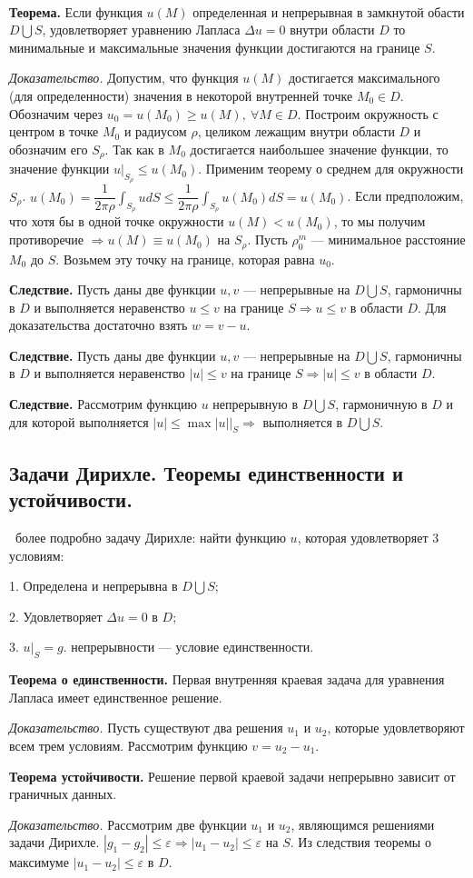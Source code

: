\documentclass[9pt]{article}
\begin{document}
\ 
\par\textbf{Теорема.} Если функция \(u(M)\) определенная и непрерывная в замкнутой обасти \(D\bigcup S\), удовлетворяет уравнению Лапласа \(\Delta u=0\) внутри области \(D\) то минимальные и максимальные значения функции достигаются на границе \(S\).
\par\textit{Доказательство.} Допустим, что функция \(u(M)\) достигается максимального (для определенности) значения в некоторой внутренней точке \(M_0\in D\). Обозначим через \(u_0=u(M_0)\ge u(M),\ \forall M\in D\). Построим окружность с центром в точке \(M_0\) и радиусом \(\rho\), целиком лежащим внутри области \(D\) и обозначим его \(S_\rho\). Так как в \(M_0\) достигается наибольшее значение функции, то значение функции \(u|_{S_\rho}\le u(M_0)\). Применим теорему о среднем для окружности \(S_\rho\). \(u(M_0)=\dfrac{1}{2\pi \rho}\int_{S_\rho}udS\le \dfrac{1}{2\pi\rho}\int_{S_\rho}u(M_0)dS=u(M_0)\). Если предположим, что хотя бы в одной точке окружности \(u(M)<u(M_0)\), то мы получим противоречие \(\Rightarrow u(M)\equiv u(M_0)\) на \(S_\rho\). Пусть \(\rho_0^m\) --- минимальное расстояние \(M_0\) до \(S\). Возьмем эту точку на границе, которая равна \(u_0\).
\par\textbf{Следствие.} Пусть даны две функции \(u,v\) --- непрерывные на \(D\bigcup S\), гармоничны в \(D\) и выполняется неравенство \(u\le v\) на границе \(S\Rightarrow u\le v\) в области \(D\). Для доказательства достаточно взять \(w=v-u\).
\par\textbf{Следствие.} Пусть даны две функции \(u,v\) --- непрерывные на \(D\bigcup S\), гармоничны в \(D\) и выполняется неравенство \(|u|\le v\) на границе \(S\Rightarrow |u|\le v\) в области \(D\).
\par\textbf{Следствие.} Рассмотрим функцию \(u\) непрерывную в \(D\bigcup S\), гармоничную в \(D\) и для которой выполняется \(|u|\le\max|u||_S\Rightarrow\) выполняется в \(D\bigcup S\).

\subsection{Задачи Дирихле. Теоремы единственности и устойчивости.}

\ 
 более подробно задачу Дирихле: найти функцию \(u\), которая удовлетворяет 3 условиям:
\par1. Определена и непрерывна в \(D\bigcup S\);
\par2. Удовлетворяет \(\Delta u=0\) в \(D\);
\par3. \(u|_S=g\).
 непрерывности --- условие единственности. 
\par\textbf{Теорема о единственности.} Первая внутренняя краевая задача для уравнения Лапласа имеет единственное решение.
\par\textit{Доказательство.} Пусть существуют два решения \(u_1\) и \(u_2\), которые удовлетворяют всем трем условиям. Рассмотрим функцию \(v=u_2-u_1\).
\par\textbf{Теорема устойчивости.} Решение первой краевой задачи непрерывно зависит от граничных данных.
\par\textit{Доказательство.} Рассмотрим две функции \(u_1\) и \(u_2\), являющимся решениями задачи Дирихле. \(|g_1-g_2|\le\varepsilon\Rightarrow|u_1-u_2|\le\varepsilon\) на \(S\). Из следствия теоремы о максимуме \(|u_1-u_2|\le\varepsilon\) в \(D\).
\end{document}
